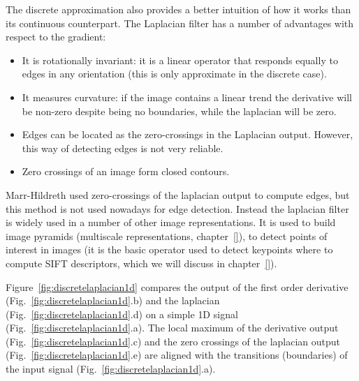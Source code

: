 The discrete approximation also provides a better intuition of how it works than its continuous counterpart. The Laplacian filter has a number of advantages with respect to the gradient:
\begin{itemize}
	\item It is rotationally invariant: it is a linear operator that responds equally to edges in any orientation (this is only approximate in the discrete case).
	\item It measures curvature: if the image contains a linear trend the derivative will be non-zero despite being no boundaries, while the laplacian will be zero.
	\item Edges can be located as the zero-crossings in the Laplacian output. However, this way of detecting edges is not very reliable.
	\item Zero crossings of an image form closed contours.
\end{itemize}

Marr-Hildreth \cite{} used zero-crossings of the laplacian output to compute edges, but this method is not used nowadays for edge detection. Instead the laplacian filter is widely used in a number of other image representations. It is used to build image pyramids (multiscale representations, chapter~\ref{}), to detect points of interest in images (it is the basic operator used to detect keypoints where to compute SIFT descriptors, which we will discuss in chapter~\ref{}).

Figure~\ref{fig:discretelaplacian1d} compares the output of the first order derivative (Fig.~\ref{fig:discretelaplacian1d}.b) and the laplacian (Fig.~\ref{fig:discretelaplacian1d}.d) on a simple 1D signal (Fig.~\ref{fig:discretelaplacian1d}.a). The local maximum of the derivative output (Fig.~\ref{fig:discretelaplacian1d}.c) and the zero crossings of the laplacian output (Fig.~\ref{fig:discretelaplacian1d}.e) are aligned with the transitions (boundaries) of the input signal (Fig.~\ref{fig:discretelaplacian1d}.a).

